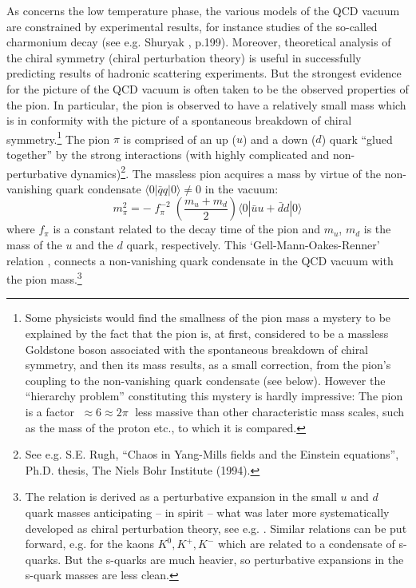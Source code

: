 \documentclass[12pt]{article}
\begin{document}
As concerns the low temperature phase, the various models of the
QCD vacuum are constrained by experimental results, for instance
studies of the so-called charmonium decay (see e.g. Shuryak
\cite{shuryak88}, p.199). Moreover, theoretical analysis of the
chiral symmetry (chiral perturbation theory) is useful in
successfully predicting results of hadronic scattering experiments.
But the strongest evidence for the picture of the QCD vacuum is
often taken to be the observed properties of the pion. In
particular, the pion is observed to have a relatively small mass
which is in conformity with the picture of a spontaneous breakdown
of chiral symmetry.\footnote{Some physicists would find the
smallness of the pion mass a mystery to be explained by the fact
that the pion is, at first, considered to be a massless Goldstone
boson associated with the spontaneous breakdown of chiral
symmetry, and then its mass results, as a small correction, from
the pion's coupling to the non-vanishing quark condensate (see
below). However the ``hierarchy problem'' constituting this
mystery is hardly impressive: The pion is a factor $\; \approx 6
\approx 2 \pi \; $ less massive than other characteristic mass
scales, such as the mass of the proton etc., to which it is
compared.} The pion $\pi$ is comprised of an up ($u$) and a down
($d$) quark ``glued together'' by the strong interactions (with
highly complicated and non-perturbative dynamics)\footnote{See
e.g. S.E. Rugh, ``Chaos in Yang-Mills fields and the Einstein
equations'', Ph.D. thesis, The Niels Bohr Institute (1994).}. The
massless pion acquires a mass by virtue of the non-vanishing quark
condensate $\langle 0 | \bar{q} q | 0 \rangle  \neq 0$ in the vacuum:
\begin{equation} \label{GOR}
m_{\pi}^2 = - \; f_{\pi}^{-2} \; (\frac{m_u + m_d}{2})
\langle 0 | \bar{u} u + \bar{d} d | 0 \rangle 
\end{equation}
where $f_{\pi}$ is a constant related to the decay time of the
pion and $m_{u}$, $m_{d}$ is the mass of the $u$ and the $d$
quark, respectively. This `Gell-Mann-Oakes-Renner' relation
\cite{gellmann68,koch97}, connects a non-vanishing quark
condensate in the QCD vacuum with the pion mass.\footnote{The
relation is derived as a perturbative expansion in the small $u$
and $d$ quark masses anticipating -- in spirit -- what was later
more systematically developed as chiral perturbation theory, see
e.g. \cite{leutwyler94}. Similar relations can be put forward,
e.g. for the kaons $K^{0}, K^{+}, K^{-}$ which are related to a
condensate of s-quarks. But the s-quarks are much heavier, so
perturbative expansions in the s-quark masses are less clean.}
\end{document}

